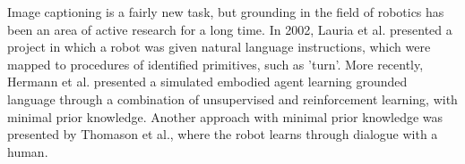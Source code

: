 \documentclass{article}
\begin{document}

Image captioning is a fairly new task, but grounding in the field of robotics has been an area of active research for a long time. In 2002, Lauria et al. presented a project in which a robot was given natural language instructions, which were mapped to procedures of identified primitives, such as 'turn'\cite{lauria2002}. More recently, Hermann et al. presented a simulated embodied agent learning grounded language through a combination of unsupervised and reinforcement learning, with minimal prior knowledge\cite{hermann2017grounded}. Another approach with minimal prior knowledge was presented by Thomason et al., where the robot learns through dialogue with a human\cite{thomason2019grounded}.
\end{document}
